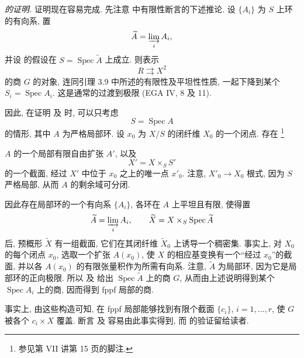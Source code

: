 \noindent\textit{ 的证明.}
证明现在容易完成.
先注意 中有限性断言的下述推论.
设 \(\{A_i\}\) 为 \(S\) 上环的有向系, 置
\[
  \widetilde A=\varinjlim_i A_i,
\]
并设 的假设在 \(S=\operatorname{Spec}\widetilde A\)
上成立. 则表示
\[
  R\rightrightarrows X^2
\]
的商 \(G\) 的对象, 连同引理 3.9 中所述的有限性及平坦性性质,
一起下降到某个 \(S_i=\operatorname{Spec}A_i\).
这是通常的过渡到极限 (EGA IV, 8 及 11).

因此, 在证明
及 时, 可以只考虑
\[
  S=\operatorname{Spec}A
\]
的情形, 其中 \(A\) 为严格局部环.
设 \(x_0\) 为 \(X/S\) 的闭纤维 \(X_0\) 的一个闭点.
存在\begingroup
\renewcommand{\thefootnote}{\ensuremath{\ast}}\footnote{参见第 VII 讲第 15 页的脚注.}
\addtocounter{footnote}{-1}
\endgroup{} \(A\) 的一个局部有限自由扩张 \(A'\), 以及
\[
  X'=X\times_S S'
\]
的一个截面, 经过 \(X'\) 中位于 \(x_0\) 之上的唯一点 \(x'_0\).
注意, \(X'_0\to X_0\) 根式, 因为 \(S\) 严格局部,
从而 \(A\) 的剩余域可分闭.

因此存在局部环的一个有向系 \(\{A_i\}\), 各环在 \(A\) 上平坦且有限,
使得置
\[
  \widetilde A=\varinjlim_i A_i,\qquad
  \widetilde X=X\times_S\operatorname{Spec}\widetilde A
\]
后, 预概形 \(\widetilde X\) 有一组截面,
它们在其闭纤维 \(\widetilde X_0\) 上诱导一个稠密集.
事实上, 对 \(X_0\) 的每个闭点 \(x_0\),
选取一个扩张 \(A(x_0)\), 使 \(X\) 的相应基变换有一个“经过 \(x_0\)”的截面,
并以各 \(A(x_0)\) 的有限张量积作为所需有向系.
注意, \(\widetilde A\) 为局部环, 因为它是局部环的正向极限.
所以
及
给出 \(\operatorname{Spec}\widetilde A\) 上的商 \(G\),
从而由上述说明得到某个 \(\operatorname{Spec}A_i\) 上的商, 因而得到 fppf 局部的商.

事实上, 由这些构造可知, 在 fppf 局部能够找到有限个截面
\(\{c_i\}\), \(i=1,\ldots,r\), 使 \(G\) 被各个 \(c_i\times X\) 覆盖.
断言
及
容易由此事实得到, 而 的验证留给读者.

